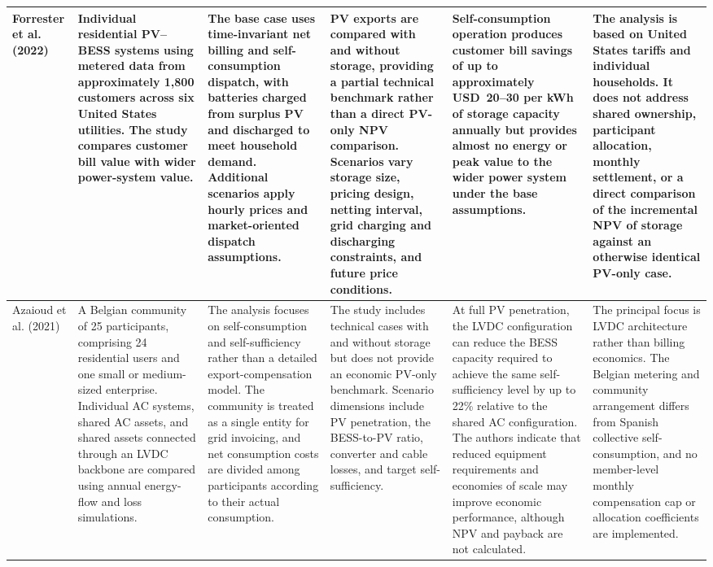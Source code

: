 \begin{landscape}
\begin{longtable}{
p{2.5cm}
p{3.2cm}
p{3.9cm}
p{3.6cm}
p{3.5cm}
p{5.0cm}
}
\\ \midrule

Forrester et al. (2022)
\cite{ch2ref031}
&
Individual residential PV--BESS systems using metered data from
approximately 1,800 customers across six United States utilities. The
study compares customer bill value with wider power-system value.
&
The base case uses time-invariant net billing and self-consumption
dispatch, with batteries charged from surplus PV and discharged to meet
household demand. Additional scenarios apply hourly prices and
market-oriented dispatch assumptions.
&
PV exports are compared with and without storage, providing a partial
technical benchmark rather than a direct PV-only NPV comparison.
Scenarios vary storage size, pricing design, netting interval, grid
charging and discharging constraints, and future price conditions.
&
Self-consumption operation produces customer bill savings of up to
approximately USD~20--30 per kWh of storage capacity annually but
provides almost no energy or peak value to the wider power system under
the base assumptions.
&
The analysis is based on United States tariffs and individual
households. It does not address shared ownership, participant
allocation, monthly settlement, or a direct comparison of the
incremental NPV of storage against an otherwise identical PV-only case.

\\ \midrule

Azaioud et al. (2021)
\cite{ch2ref051}
&
A Belgian community of 25 participants, comprising 24 residential users
and one small or medium-sized enterprise. Individual AC systems, shared
AC assets, and shared assets connected through an LVDC backbone are
compared using annual energy-flow and loss simulations.
&
The analysis focuses on self-consumption and self-sufficiency rather
than a detailed export-compensation model. The community is treated as a
single entity for grid invoicing, and net consumption costs are divided
among participants according to their actual consumption.
&
The study includes technical cases with and without storage but does not
provide an economic PV-only benchmark. Scenario dimensions include PV
penetration, the BESS-to-PV ratio, converter and cable losses, and
target self-sufficiency.
&
At full PV penetration, the LVDC configuration can reduce the BESS
capacity required to achieve the same self-sufficiency level by up to
22\% relative to the shared AC configuration. The authors indicate that
reduced equipment requirements and economies of scale may improve
economic performance, although NPV and payback are not calculated.
&
The principal focus is LVDC architecture rather than billing economics.
The Belgian metering and community arrangement differs from Spanish
collective self-consumption, and no member-level monthly compensation
cap or allocation coefficients are implemented.


\end{longtable}
\end{landscape}
